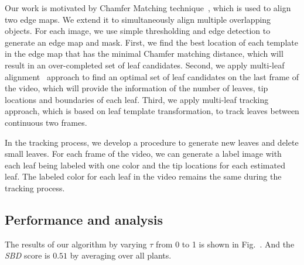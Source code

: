 Our work is motivated by Chamfer Matching technique~\cite{barrow1977parametric}, which is used to align two edge maps.
We extend it to simultaneously align multiple overlapping objects.
For each image, we use simple thresholding and edge detection to generate an edge map and mask.
First, we find the best location of each template in the edge map that has the minimal Chamfer matching distance, which will result in an over-completed set of leaf candidates.
Second, we apply multi-leaf alignment~\cite{yin2014a} approach to find an optimal set of leaf candidates on the last frame of the video, which will provide the information of the number of leaves, tip locations and boundaries of each leaf.
Third, we apply multi-leaf tracking~\cite{yin2014b} approach, which is based on leaf template transformation, to track leaves between continuous two frames.

In the tracking process, we develop a procedure to generate new leaves and delete small leaves.
For each frame of the video, we can generate a label image with each leaf being labeled with one color and the tip locations for each estimated leaf.
The labeled color for each leaf in the video remains the same during the tracking process.


\subsection{Performance and analysis}
The results of our algorithm by varying $\tau$ from 0 to 1 is shown in Fig.~.
And the {\it{SBD}} score is $0.51$ by averaging over all plants.





